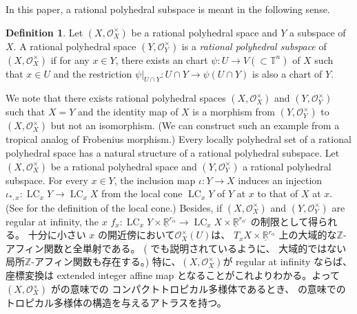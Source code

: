 \documentclass[a4paper,dvipdfmx,reqno,12pt]{amsart}
\theoremstyle{definition}
\newtheorem{definition}[theorem]{Definition}
\newcommand{\opn}[1]{\operatorname{#1}}
\numberwithin{equation}{section}
\begin{document}
In this paper, a rational polyhedral subspace is meant
in the following sense.

\begin{definition}
Let 
$(X,\mathcal{O}_X^{\times})$ be a rational polyhedral space
and $Y$ a subspace of $X$.
A rational polyhedral space $(Y,\mathcal{O}_Y^{\times})$ is 
a \emph{rational polyhedral subspace} of
$(X,\mathcal{O}_X^{\times})$ if 
for any $x\in Y$, there exists an chart
$\psi \colon U \to V (\subset \mathbb{T}^{n})$
of $X$
such that $x\in U$ and the restriction
$\psi|_{U\cap Y}\colon U\cap Y\to 
\psi(U\cap Y)$ is also a chart of $Y$.
\end{definition}
We note that there exists rational polyhedral spaces
$(X,\mathcal{O}_X^{\times})$
and $(Y,\mathcal{O}_Y^{\times})$
such that $X=Y$ and the identity map of $X$ 
is a morphism from $(Y,\mathcal{O}_Y^{\times})$ to
$(X,\mathcal{O}_X^{\times})$ but not an isomorphism.
(We can construct such an example from a tropical analog of
Frobenius morphism.)
Every locally polyhedral set of a rational polyhedral space
\cite[Definition 2.4 (d)]{MR4637248} has a natural 
structure of a rational polyhedral subspace.
Let $(X,\mathcal{O}_X^{\times})$ be a rational
polyhedral space and $(Y,\mathcal{O}_Y^{\times})$
a rational polyhedral subspace.
For every $x\in Y$, 
the inclusion map $\iota\colon Y\to X$ induces
an injection 
$\iota_{*,x}\colon \opn{LC}_x Y\to \opn{LC}_x X$
from the local cone $\opn{LC}_x Y$ of $Y$ at $x$ to 
that of $X$ at $x$.
(See \cite[]{MR4637248} for
the definition of the local cone.)
Besides, if
$(X,\mathcal{O}_X^{\times})$ and
$(Y,\mathcal{O}_Y^{\times})$ are
regular at infinity, 
the $x$
$f_{x}\colon \opn{LC}_x Y\times 
\underline{\mathbb{R}}^{r_{\alpha}}
\to \opn{LC}_x X\times \underline{\mathbb{R}}^{r_{\alpha'}}$
の制限として得られる。
十分に小さい $x$
の開近傍において$\mathcal{O}_X^{\times}(U)$は、
$T_x X\times \underline{\mathbb{R}}^{r_{\alpha}}$
上の大域的な$\mathbb{Z}$-アフィン関数と全単射である。
(\cite[Example 2.1]{MR4637248} でも説明されているように、
大域的ではない局所$\mathbb{Z}$-アフィン関数も存在する。)
特に、$(X,\mathcal{O}_X^{\times})$が regular at infinity
ならば、座標変換は
extended integer affine map \cite[Definition 2.2]{demedrano2023chern}
となることがこれよりわかる。よって
$(X,\mathcal{O}_X^{\times})$ 
が\cite[Definition 6.1]{gross2019sheaftheoretic}の意味での
コンパクトトロピカル多様体であるとき、
\cite[Definition 2.3]{demedrano2023chern}
の意味でのトロピカル多様体の構造を与えるアトラスを持つ。
\end{document}
